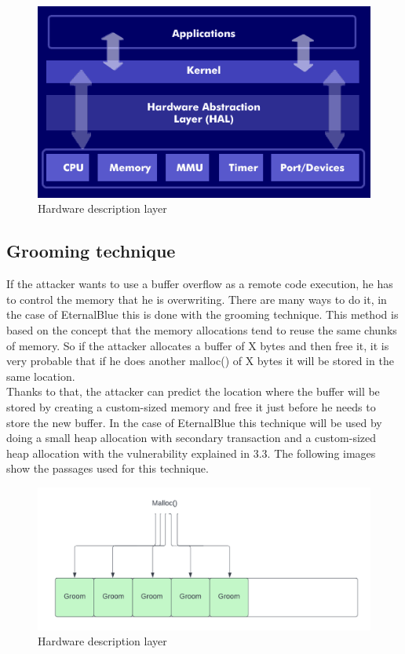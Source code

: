 \begin{figure}[ht!]
    \centering
      \includegraphics[scale=0.5]{images/hal.png}
      \caption{Hardware description layer}
\end{figure}

\clearpage

\subsection{Grooming technique}
If the attacker wants to use a buffer overflow as a remote code execution, he has to control the memory that he is overwriting. There are many ways to do it, in 
the case of EternalBlue this is done with the grooming technique\cite{eternalblue-analysis}. This method is based on the concept that the memory allocations tend to reuse the same chunks of memory. So if the 
attacker allocates a buffer of X bytes and then free it, it is very probable that if he does another malloc() of X bytes it will be stored in the same location.\\
Thanks to that, the attacker can predict the location where the buffer will be stored by creating a custom-sized memory and free it just before he needs to store the new buffer. In the case of 
EternalBlue this technique will be used by doing a small heap allocation with secondary transaction and a custom-sized heap allocation with the vulnerability explained in 3.3.
The following images show the passages used for this technique.

\begin{figure}[ht!]
    \centering
      \includegraphics[scale=0.5]{images/grooming_malloc.png}
      \caption{Hardware description layer}
\end{figure}

